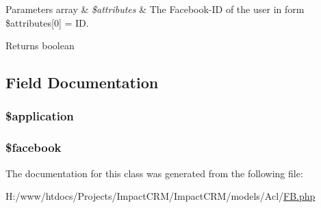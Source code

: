 \begin{DoxyParams}[1]{Parameters}
array & {\em \$attributes} & The Facebook-\/ID of the user in form \$attributes\mbox{[}0\mbox{]} = ID. \\
\hline
\end{DoxyParams}
\begin{DoxyReturn}{Returns}
boolean 
\end{DoxyReturn}


\subsection{Field Documentation}
\hypertarget{classAcl__FB_a537fa9b460dddc2a67074faab810398a}{
\subsubsection[{\$application}]{\setlength{\rightskip}{0pt plus 5cm}\$application}}
\label{classAcl__FB_a537fa9b460dddc2a67074faab810398a}
\hypertarget{classAcl__FB_a4b9bb5e9f7a5ea9381bdbe31c44e9339}{
\subsubsection[{\$facebook}]{\setlength{\rightskip}{0pt plus 5cm}\$facebook}}
\label{classAcl__FB_a4b9bb5e9f7a5ea9381bdbe31c44e9339}


The documentation for this class was generated from the following file:\begin{DoxyCompactItemize}
\item 
H:/www/htdocs/Projects/ImpactCRM/ImpactCRM/models/Acl/\hyperlink{FB_8php}{FB.php}\end{DoxyCompactItemize}
